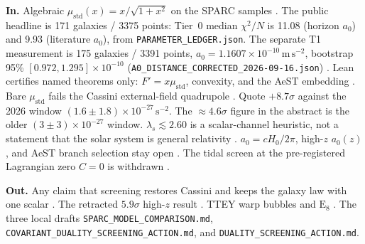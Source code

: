 \begin{tcolorbox}[enhanced,colback=qz-glass-bg,colframe=qz-glass-border,coltext=qz-bone,coltitle=qz-ice,title={\ttfamily\bfseries\small[SCOPE LEDGER] // IN THE JEWEL / NOT IN THE JEWEL (2026-10-17)},arc=3.5pt,boxrule=0.7pt,borderline north={0.4pt}{0pt}{qz-glass-rim!60},borderline west={2.5pt}{0pt}{qz-ice}]
\textbf{\color{qz-sage}In.}
Algebraic $\mu_{\mathrm{std}}(x)=x/\sqrt{1+x^2}$ on the SPARC samples .
The public headline is 171 galaxies / 3375 points: Tier~0 median $\chi^2/N$ is 11.08 (horizon $a_0$) and 9.93 (literature $a_0$), from \texttt{PARAMETER\_LEDGER.json}.
The separate T1 measurement is 175 galaxies / 3391 points, $a_0=1.1607\times10^{-10}\,\mathrm{m\,s^{-2}}$, bootstrap 95\% $[0.972,1.295]\times10^{-10}$ (\texttt{A0\_DISTANCE\_CORRECTED\_2026-09-16.json}) .
Lean certifies named theorems only: $F'=x\mu_{\mathrm{std}}$, convexity, and the AeST embedding .
Bare $\mu_{\mathrm{std}}$ fails the Cassini external-field quadrupole .
Quote $+8.7\sigma$ against the 2026 window $(1.6\pm1.8)\times10^{-27}\,\mathrm{s^{-2}}$.
The $\approx4.6\sigma$ figure in the abstract is the older $(3\pm3)\times10^{-27}$ window.
$\lambda_s\lesssim2.60$ is a scalar-channel heuristic, not a statement that the solar system is general relativity .
$a_0=cH_0/2\pi$, high-$z$ $a_0(z)$, and AeST branch selection stay open .
The tidal screen at the pre-registered Lagrangian zero $C=0$ is withdrawn .

\textbf{\color{qz-rose}Out.}
Any claim that screening restores Cassini and keeps the galaxy law with one scalar .
The retracted $5.9\sigma$ high-$z$ result .
TTEY warp bubbles and $\mathrm{E}_8$ .
The three local drafts \texttt{SPARC\_MODEL\_COMPARISON.md}, \texttt{COVARIANT\_DUALITY\_SCREENING\_ACTION.md}, and \texttt{DUALITY\_SCREENING\_ACTION.md}.
\end{tcolorbox}
\vspace{0.6em}
